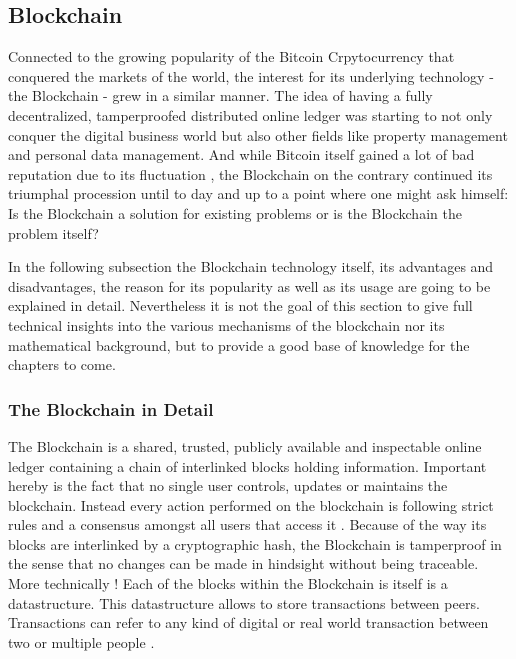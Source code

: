 \subsection{Blockchain}
\label{subsec:02_blockchain}

Connected to the growing popularity of the Bitcoin Crpytocurrency that conquered the markets of the world, the interest for its underlying technology - the Blockchain - grew in a similar manner. The idea of having a fully decentralized, tamperproofed distributed online ledger was starting to not only conquer the digital business world but also other fields like property management and personal data management. And while Bitcoin itself gained a lot of bad reputation due to its fluctuation \cite{Shackelford2016}, the Blockchain on the contrary continued its triumphal procession until to day and up to a point where one might ask himself: Is the Blockchain a solution for existing problems or is the Blockchain the problem itself? \cite{Stinchcombe2017} \cite{Nielsen2018} \cite{Lunn2015}

In the following subsection the Blockchain technology itself, its advantages and disadvantages, the reason for its popularity as well as its usage are going to be explained in detail. Nevertheless it is not the goal of this section to give full technical insights into the various mechanisms of the blockchain nor its mathematical background, but to provide a good base of knowledge for the chapters to come.

\subsubsection{The Blockchain in Detail}
The Blockchain is a shared, trusted, publicly available and inspectable online ledger containing a chain of interlinked blocks holding information. Important hereby is the fact that no single user controls, updates or maintains the blockchain. Instead every action performed on the blockchain is following strict rules and a consensus amongst all users that access it \cite{Shackelford2016}. Because of the way its blocks are interlinked by a cryptographic hash, the Blockchain is tamperproof in the sense that no changes can be made in hindsight without being traceable. 
More technically \cite{BenAyed2017}!
Each of the blocks within the Blockchain is itself is a datastructure.  This datastructure allows to store transactions between peers. Transactions can refer to any kind of digital or real world transaction between two or multiple people \cite{Wust2017}.



